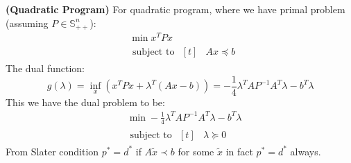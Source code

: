 \begin{remark}{\textbf{(Quadratic Program)}}
    For quadratic program, where we have primal problem (assuming $P\in\mathbb{S}^n_{++}$):
    \begin{equation*}
    \begin{aligned}
        &\min x^TPx \\
        &\text{ subject to } \begin{aligned}[t]
            &Ax\preceq b
        \end{aligned}
    \end{aligned}
    \end{equation*} 
    The dual function:
    \begin{equation*}
        g(\lambda) = \inf_x (x^TPx + \lambda^T(Ax-b)) = -\frac{1}{4}\lambda^TAP^{-1}A^T\lambda - b^T\lambda
    \end{equation*}
    This we have the dual problem to be:
    \begin{equation*}
    \begin{aligned}
        &\min -\frac{1}{4}\lambda^TAP^{-1}A^T\lambda - b^T\lambda \\
        &\text{ subject to } \begin{aligned}[t]
            &\lambda\succeq0
        \end{aligned}
    \end{aligned}        
    \end{equation*}
    From Slater condition $p^*=d^*$ if $A\tilde{x}\prec b$ for some $\tilde{x}$ in fact $p^*=d^*$ always.
\end{remark}

